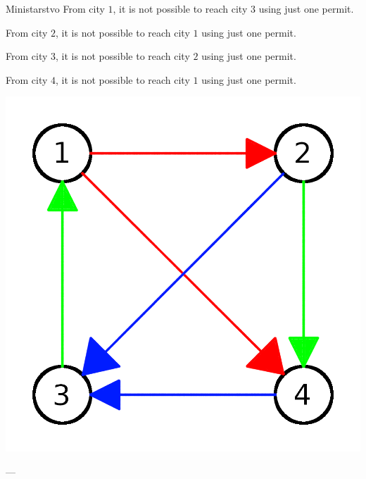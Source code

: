 \begin{statement}[
  problempoints=100,
  timelimit=1 second,
  memorylimit=1024 MiB,
]{Ministarstvo}
From city $1$, it is not possible to reach city $3$ using just one permit.

From city $2$, it is not possible to reach city $1$ using just one permit.

From city $3$, it is not possible to reach city $2$ using just one permit.

From city $4$, it is not possible to reach city $1$ using just one permit.


\centering
\includegraphics[scale=1]{pic/skcia3.png}
  
\end{statement}

---